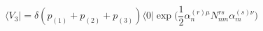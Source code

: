 \begin{equation}
	\langle V_{3}\vert=\delta(p_{(1)}+p_{(2)}+p_{(3)})\langle 0\vert \exp\Big(\frac{1}{2}\alpha^{(r)\mu}_{n}N^{rs}_{nm}\alpha^{(s)\nu}_{m}\Big)
\end{equation}

